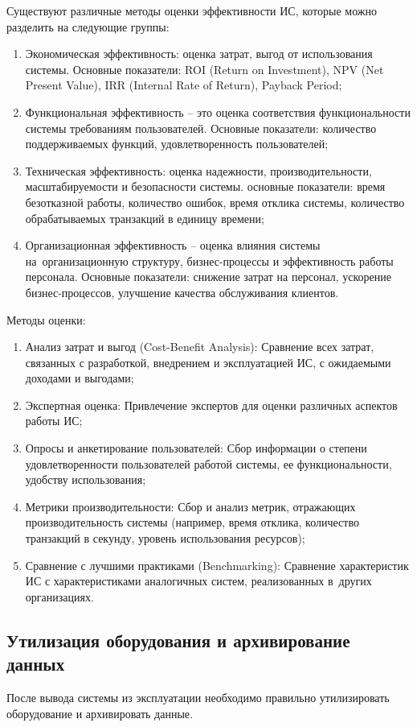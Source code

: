 \documentclass{ou}
\begin{document}
Существуют различные методы оценки эффективности ИС, которые можно разделить на следующие группы:
\begin{enumerate}[leftmargin=0em, itemindent=3.75em, nosep, label=\arabic*)]
\item Экономическая эффективность: оценка затрат, выгод от использования системы. Основные показатели: ROI (Return on Investment), NPV (Net Present Value), IRR (Internal Rate of Return), Payback Period;
\item Функциональная эффективность -- это оценка соответствия функциональности системы требованиям пользователей. Основные показатели: количество поддерживаемых функций, удовлетворенность пользователей;
\item Техническая эффективность: оценка надежности, производительности, масштабируемости и безопасности системы. основные показатели: время безотказной работы, количество ошибок, время отклика системы, количество обрабатываемых транзакций в единицу времени;
\item Организационная эффективность -- оценка влияния системы на~организационную структуру, бизнес-процессы и эффективность работы персонала. Основные показатели: снижение затрат на персонал, ускорение бизнес-процессов, улучшение качества обслуживания клиентов.
\end{enumerate}

Методы оценки:
\begin{enumerate}[leftmargin=0em, itemindent=3.75em, nosep, label=\arabic*)]
\item Анализ затрат и выгод (Cost-Benefit Analysis): Сравнение всех затрат, связанных с разработкой, внедрением и эксплуатацией ИС, с ожидаемыми доходами и выгодами;
\item Экспертная оценка: Привлечение экспертов для оценки различных аспектов работы ИС;
\item Опросы и анкетирование пользователей: Сбор информации о степени удовлетворенности пользователей работой системы, ее функциональности, удобству использования;
\item Метрики производительности: Сбор и анализ метрик, отражающих производительность системы (например, время отклика, количество транзакций в секунду, уровень использования ресурсов);
\item Сравнение с лучшими практиками (Benchmarking): Сравнение характеристик ИС с характеристиками аналогичных систем, реализованных в~других организациях.
\end{enumerate}
\subsection{Утилизация оборудования и архивирование данных}
После вывода системы из эксплуатации необходимо правильно утилизировать оборудование и архивировать данные.
\end{document}
